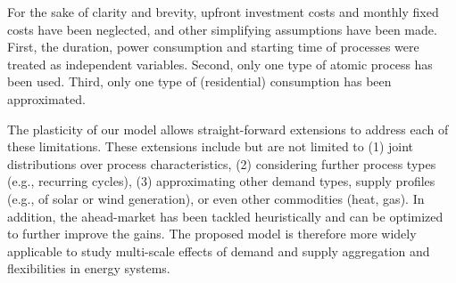 \documentclass[conference]{IEEEtran}
\begin{document}
For the sake of clarity and brevity, upfront investment costs and monthly fixed costs have been neglected, and other simplifying assumptions have been made. First, the duration, power consumption and starting time of processes were treated as independent variables. Second, only one type of atomic process has been used. Third, only one type of (residential) consumption has been approximated. 

The plasticity of our model allows straight-forward extensions to address each of these limitations. These extensions include but are not limited to (1) joint distributions over process characteristics, (2) considering further process types (e.g., recurring cycles), (3) approximating other demand types, supply profiles (e.g., of solar or wind generation), or even other commodities (heat, gas). In addition, the ahead-market has been tackled heuristically and can be optimized to further improve the gains. %
The proposed model is therefore more widely applicable to study multi-scale effects of demand and supply aggregation and flexibilities in energy systems.



\balance

\end{document}
